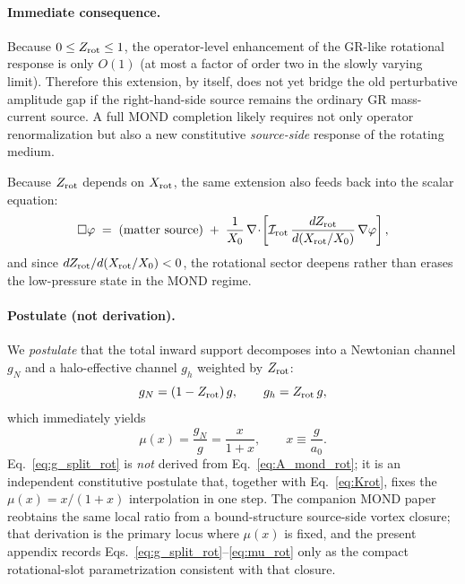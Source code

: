 \documentclass[11pt]{article}
\begin{document}
\paragraph{Immediate consequence.}
Because $0\leq Z_{\rm rot}\leq 1$, the operator-level enhancement of the GR-like rotational response is only $O(1)$ (at most a factor of order two in the slowly varying limit). Therefore this extension, by itself, does not yet bridge the old perturbative amplitude gap if the right-hand-side source remains the ordinary GR mass-current source. A full MOND completion likely requires not only operator renormalization but also a new constitutive \emph{source-side} response of the rotating medium.

Because $Z_{\rm rot}$ depends on $X_{\rm rot}$, the same extension also feeds back into the scalar equation:
\begin{equation}
\Box\phi
\;=\;
\text{(matter source)}
\;+\;
\frac{1}{X_0}\,
\nabla\!\cdot\!\left[
\mathcal I_{\rm rot}\,
\frac{dZ_{\rm rot}}{d(X_{\rm rot}/X_0)}\,
\nabla\phi
\right],
\label{eq:phi_backreaction_rot}
\end{equation}
and since $dZ_{\rm rot}/d(X_{\rm rot}/X_0)<0$, the rotational sector deepens rather than erases the low-pressure state in the MOND regime.

\paragraph{Postulate (not derivation).}
We \emph{postulate} that the total inward support decomposes into a Newtonian channel $g_N$ and a halo-effective channel $g_h$ weighted by $Z_{\rm rot}$:
\begin{equation}
g_N = (1-Z_{\rm rot})\,g,
\qquad
g_h = Z_{\rm rot}\,g,
\label{eq:g_split_rot}
\end{equation}
which immediately yields
\begin{equation}
\mu(x)=\frac{g_N}{g}=\frac{x}{1+x},
\qquad x\equiv \frac{g}{a_0}.
\label{eq:mu_rot}
\end{equation}
Eq.~\eqref{eq:g_split_rot} is \emph{not} derived from Eq.~\eqref{eq:A_mond_rot}; it is an independent constitutive postulate that, together with Eq.~\eqref{eq:Krot}, fixes the $\mu(x)=x/(1+x)$ interpolation in one step. The companion MOND paper~\cite{Lotishvili2026MOND} reobtains the same local ratio from a bound-structure source-side vortex closure; that derivation is the primary locus where $\mu(x)$ is fixed, and the present appendix records Eqs.~\eqref{eq:g_split_rot}--\eqref{eq:mu_rot} only as the compact rotational-slot parametrization consistent with that closure.
\end{document}
